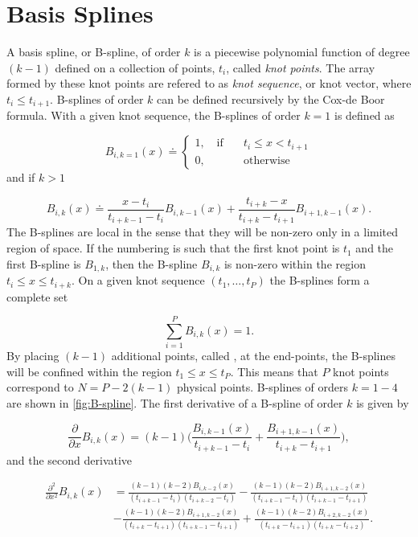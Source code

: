 \chapter{Basis Splines}\label{B-splines}
A basis spline, or B-spline, of order $k$ is a piecewise polynomial function of degree $(k-1)$ defined on a collection of points, $t_i$, called \textit{knot points}. The array formed by these knot points are refered to as \textit{knot sequence}, or knot vector, where $t_i\leq t_{i+1}$. B-splines of order $k$ can be defined recursively by the Cox-de Boor formula. With a given knot sequence, the B-splines of order $k=1$ is defined as

\begin{equation}
B_{i,k=1}(x) \doteq
\begin{cases}
1, \quad \text{if} \quad & t_i \leq x < t_{i+1}\\
0,& \text{otherwise} 
\end{cases}
\end{equation}
and if $k>1$

\begin{equation}
B_{i,k}(x) \doteq \frac{x-t_i}{t_{i+k-1}-t_i}B_{i,k-1}(x) + \frac{t_{i+k}-x}{t_{i+k}-t_{i+1}}B_{i+1,k-1}(x).
\end{equation}
The B-splines are local in the sense that they will be non-zero only in a limited region of space. If the numbering is such that the first knot point is $t_1$ and the first  B-spline is $B_{1,k}$, then the B-spline $B_{i,k}$ is non-zero within the region $t_i \leq x \leq t_{i+k}$. On a given knot sequence $(t_1,\ldots , t_P)$ the B-splines form a complete set

\begin{equation}
\sum_{i=1}^{P} B_{i,k}(x) = 1.
\end{equation}
By placing $(k-1)$ additional points, called , at the end-points, the B-splines will be confined within the region $t_1 \leq x \leq t_P$. This means that $P$ knot points correspond to $N=P-2(k-1)$ physical points. B-splines of orders $k=1-4$ are shown in \cref{fig:B-spline}. The first derivative of a B-spline of order $k$ is given by

\begin{equation}
\frac{\partial}{\partial x}B_{i,k}(x) = (k-1)\bigg(\frac{B_{i,k-1}(x)}{t_{i+k-1}-t_i} + \frac{B_{i+1,k-1}(x)}{t_{i+k}-t_{i+1}}\bigg),
\end{equation}
and the second derivative

\begin{align}
\frac{\partial^2}{\partial x^2}B_{i,k}(x) &= \frac{(k-1)(k-2)B_{i,k-2}(x)}{(t_{i+k-1}-t_i)(t_{i+k-2}-t_i)} - \frac{(k-1)(k-2)B_{i+1,k-2}(x)}{(t_{i+k-1}-t_i)(t_{i+k-1}-t_{i+1})}\nonumber\\
&- \frac{(k-1)(k-2)B_{i+1,k-2}(x)}{(t_{i+k}-t_{i+1})(t_{i+k-1}-t_{i+1})} +  \frac{(k-1)(k-2)B_{i+2,k-2}(x)}{(t_{i+k}-t_{i+1})(t_{i+k}-t_{i+2})}.
\end{align}

